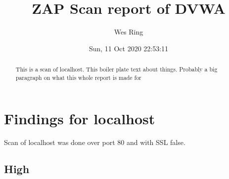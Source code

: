 \documentclass[10pt]{article}
\title{ZAP Scan report of DVWA}
\author{Wes Ring}
\date{Sun, 11 Oct 2020 22:53:11}
\begin{document}
\null  %
\nointerlineskip  %
\vfill
\let\snewpage \newpage
\let\newpage \relax
\maketitle
\let \newpage \snewpage
\vfill 
\newpage

{\hypersetup{linktoc=all,hidelinks}
\tableofcontents
}

\newpage
\vspace*{5pt}
\begin{abstract}
This is a scan of localhost. This boiler plate text about things. Probably a big paragraph on what this whole report is made for
 \newpage
\end{abstract}
\section{Findings for localhost}
Scan of localhost was done over port 80 and with SSL false.
\subsection{High}
\end{document}
